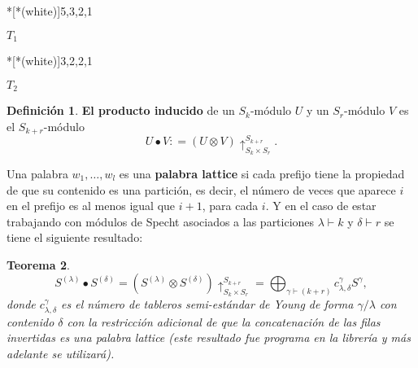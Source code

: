 \documentclass[12pt]{book}
\newtheorem{theorem}{Teorema}[section]
\theoremstyle{definition}
\newtheorem{definition}[theorem]{Definición}
\newcounter{in}
\newcounter{ini}
\begin{document}
\begin{center}
  \begin{minipage}[h]{0.2\linewidth}
    \centering {}*[*(white)]{5,3,2,1} \medskip

   $T_{1}$ 
  \end{minipage}
  \begin{minipage}[h]{0.15\linewidth}
    \centering {}*[*(white)]{3,2,2,1} \smallskip

    $T_{2}$
  \end{minipage}
\end{center}
\begin{definition}
\label{ind_prod}
\textbf{El producto inducido} de un $S_k$-módulo $U$ y un $S_r$-módulo $V$ es
el $S_{k + r}$-módulo
$$U \bullet V \colon = (U \otimes V) \uparrow^{S_{k + r}}_{S_{k} \times S_{r}}.$$
\end{definition}
Una palabra $w_{1},\ldots,w_{l}$ es una \textbf{palabra lattice} si cada prefijo tiene la propiedad de que su contenido es una partición, es decir, el número de veces que aparece $i$ en el prefijo es al menos igual que $i + 1$, para cada $i$. Y en el caso de estar trabajando con módulos de Specht asociados a las particiones $\lambda \vdash k$ y $\delta \vdash r$ se tiene el siguiente resultado:
\begin{theorem}
$$S^{(\lambda)} \bullet S^{(\delta)} = (S^{(\lambda)} \otimes S^{(\delta)}) \uparrow^{S_{k+r}}_{S_{k} \times S_{r}} = \bigoplus_{\gamma \vdash  (k + r)} c_{\lambda,\delta}^{\gamma}S^{\gamma},$$
donde $c_{\lambda,\delta}^{\gamma}$ es el número de tableros semi-estándar de Young de forma $\gamma / \lambda$ con contenido $\delta$ con la restricción adicional de que la concatenación de las filas invertidas es una palabra lattice (este resultado fue programa en la librería y más adelante se utilizará).
\end{theorem}
\end{document}
